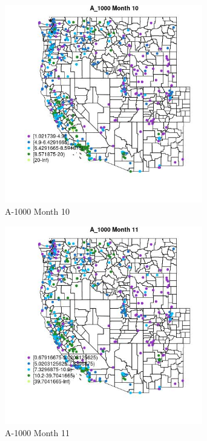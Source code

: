 \clearpage 

\begin{figure} 
\centering  
\includegraphics[width=0.77\textwidth]{Code_Outputs/ML_input_report_ML_input_PM25_Step5_part_d_de_duplicated_aves_ML_input_MapObsMo10A_1000.jpg} 
\caption{\label{fig:ML_input_report_ML_input_PM25_Step5_part_d_de_duplicated_aves_ML_inputMapObsMo10A_1000}A-1000 Month 10} 
\end{figure} 
 

\begin{figure} 
\centering  
\includegraphics[width=0.77\textwidth]{Code_Outputs/ML_input_report_ML_input_PM25_Step5_part_d_de_duplicated_aves_ML_input_MapObsMo11A_1000.jpg} 
\caption{\label{fig:ML_input_report_ML_input_PM25_Step5_part_d_de_duplicated_aves_ML_inputMapObsMo11A_1000}A-1000 Month 11} 
\end{figure} 
 

